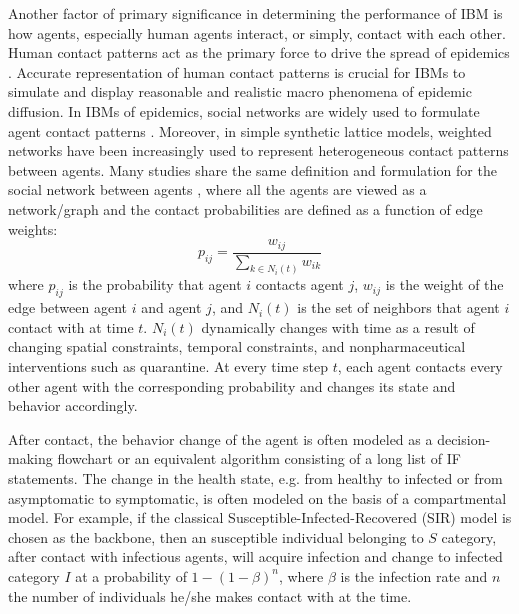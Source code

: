 \documentclass[8pt,twocolumn]{extarticle}
\begin{document}
Another factor of primary significance in determining the performance of IBM is how agents, especially human agents interact, or simply, contact with each other. Human contact patterns act as the primary force to drive the spread of epidemics \cite{IBMReview2017}. Accurate representation of human contact patterns is crucial for IBMs to simulate and display reasonable and realistic macro phenomena of epidemic diffusion. In IBMs of epidemics, social networks are widely used to formulate agent contact patterns \cite{IBMSurvey2018}. Moreover, in simple synthetic lattice models, weighted networks have been increasingly used to represent heterogeneous contact patterns between agents. Many studies share the same definition and formulation for the social network between agents \cite{SN1,SN2,SN3}, where all the agents are viewed as a network/graph and the contact probabilities are defined as a function of edge weights:
\[p_{ij} = \frac{w_{ij}}{\sum_{k\in N_{i}(t)}w_{ik}}\]
where $p_{ij}$ is the probability that agent $i$ contacts agent $j$, $w_{i j}$ is the weight of the edge between agent $i$ and agent $j$, and $N_i(t)$ is the set of neighbors that agent $i$ contact with at time $t$. $N_i(t)$ dynamically changes with time as a result of changing spatial constraints, temporal constraints, and nonpharmaceutical interventions such as quarantine. At every time step $t$, each agent contacts every other agent with the corresponding probability and changes its state and behavior accordingly. 

After contact, the behavior change of the agent is often modeled as a decision-making flowchart or an equivalent algorithm consisting of a long list of IF statements. The change in the health state, e.g. from healthy to infected or from asymptomatic to symptomatic, is often modeled on the basis of a compartmental model. For example, if the classical Susceptible-Infected-Recovered (SIR) model is chosen as the backbone, then an susceptible individual belonging to $S$ category, after contact with infectious agents, will acquire infection and change to infected category $I$ at a probability of $1-(1-\beta)^n$, where $\beta$ is the infection rate and $n$ the number of individuals he/she makes contact with at the time.
\end{document}
